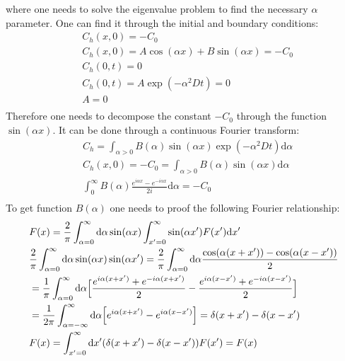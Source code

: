 \documentclass{article}
\begin{document}
\begin{description}
\begin{equation}
\end{equation}
where one needs to solve the eigenvalue problem to find the necessary $\alpha$ parameter. One can
find it through the initial and boundary conditions:
\begin{equation}
\begin{aligned}
&C_h(x,0)=-C_0\\
&C_h(x,0)=A\cos(\alpha x)+B\sin(\alpha x)=-C_0\\
&C_h(0,t)=0\\
&C_h(0,t)=A\exp(-\alpha^2 D t)=0\\
&A=0\\
\end{aligned}
\end{equation}
Therefore one needs to decompose the constant $-C_0$ through the function $\sin(\alpha x)$. It can
be done through a continuous Fourier transform:
\begin{equation}
\begin{aligned}
&C_h=\int_{\alpha>0}{B(\alpha) \sin(\alpha x) \exp(-\alpha^2 D t) \mathrm{d}\alpha}\\
&C_h(x,0)=-C_0=\int_{\alpha>0}{B(\alpha)\sin(\alpha x) \mathrm{d}\alpha}\\
&\int_{0}^{\infty}{B(\alpha) \frac{e^{i\alpha x}-e^{-i\alpha x}}{2 i}\mathrm{d} \alpha}=-C_0\\
\end{aligned}
\end{equation}
To get function $B(\alpha)$ one needs to proof the following Fourier relationship:
\begin{equation}
\begin{aligned}
&F(x)=\frac{2}{\pi}\int_{\alpha=0}^{\infty}{\mathrm{d}\alpha \sin(\alpha x)
\int_{x'=0}^{\infty}{\sin(\alpha x')F(x')\mathrm{d} x'}}\\
&\frac{2}{\pi}\int_{\alpha=0}^{\infty}{\mathrm{d}\alpha \sin(\alpha x)\sin(\alpha x')}=\frac{2}{\pi}
\int_{\alpha=0}^{\infty}{\mathrm{d}\alpha \frac{\cos(\alpha(x+x'))-\cos(\alpha(x-x'))}{2}}\\
&=\frac{1}{\pi}\int_{\alpha=0}^{\infty}{\mathrm{d}\alpha\Bigl[\frac{e^{i\alpha
(x+x')}+e^{-i\alpha(x+x')}}{2}-\frac{e^{i\alpha
(x-x')}+e^{-i\alpha(x-x')}}{2}\Bigr]}\\
&=\frac{1}{2\pi}\int_{\alpha=-\infty}^{\infty}{\mathrm{d}\alpha\Bigl[e^{i\alpha(x+x')}-e^{
i\alpha(x-x')} \Bigr]}=\delta(x+x')-\delta(x-x')\\
&F(x)=\int_{x'=0}^{\infty}{\mathrm{d} x' (\delta(x+x')-\delta(x-x')) F(x')}=F(x) 
\end{aligned}

\end{equation}
\end{description}
\end{document}

